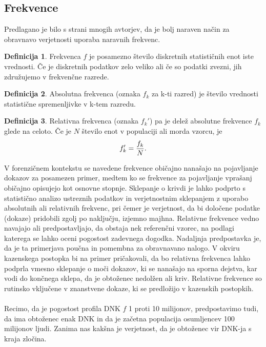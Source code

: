 \documentclass[12pt,a4paper]{amsart}
\theoremstyle{definition} %
\newtheorem{definicija}{Definicija}[section]
\theoremstyle{plain} %
\begin{document}
\subsection{Frekvence}
Predlagano je bilo s strani mnogih avtorjev, da je bolj naraven način za obravnavo verjetnosti uporaba naravnih frekvenc.
\begin{definicija}
   Frekvenca $f$ je posamezno število diskretnih statističnih enot iste vrednosti. Če je diskretnih podatkov zelo veliko ali če so
   podatki zvezni, jih združujemo v frekvenčne razrede.
\end{definicija}
\begin{definicija}
    Absolutna frekvenca (oznaka $f_k$ za k-ti razred) je število vrednosti statistične spremenljivke v k-tem razredu.
\end{definicija}
\begin{definicija}
    Relativna frekvenca (oznaka $f_k'$) pa je delež absolutne frekvence $f_k$ glede na celoto. Če je $N$ število enot v populaciji
    ali morda vzorcu, je
    \[
        f_k' = \frac{f_k}{N}. \vspace{2mm}
    \]
\end{definicija}
V forenzičnem kontekstu se navedene frekvence običajno nanašajo na pojavljanje dokazov za posamezen primer, medtem ko se frekvence za
pojavljanje vprašanj običajno opisujejo kot osnovne stopnje. Sklepanje o krivdi je lahko podprto s statistično analizo
ustreznih podatkov in verjetnostnim sklepanjem z uporabo absolutnih ali relativnih frekvenc, pri čemer je verjetnost, da bi določene
podatke (dokaze) pridobili zgolj po naključju, izjemno majhna. Relativne frekvence vedno navajajo ali predpostavljajo, da obstaja nek
referenčni vzorec, na podlagi katerega se lahko oceni pogostost zadevnega dogodka. Nadaljnja predpostavka je, da je ta primerjava poučna
in pomembna za obravnavano nalogo. V okviru kazenskega postopka bi na primer pričakovali, da bo relativna frekvenca lahko podprla
vmesno sklepanje o moči dokazov, ki se nanašajo na sporna dejstva, kar vodi do končnega sklepa, da je obtoženec nedolžen ali kriv. Relativne
frekvence so rutinsko vključene v znanstvene dokaze, ki se predložijo v kazenskih postopkih.\\\\
Recimo, da je pogostost profila DNK $f$ 1 proti 10 milijonov, predpostavimo tudi, da ima obtoženec enak DNK in da je začetna populacija osumljencev
100 milijonov ljudi. Zanima nas kakšna je verjetnost, da je obtoženec vir DNK-ja s kraja zločina. \\
\end{document}
